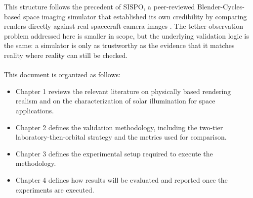 This structure follows the precedent of SISPO, a peer-reviewed Blender-Cycles-based space imaging simulator that established its own credibility by comparing renders directly against real spacecraft camera images \cite{sispo2022}. The tether observation problem addressed here is smaller in scope, but the underlying validation logic is the same: a simulator is only as trustworthy as the evidence that it matches reality where reality can still be checked.
\\\\
This document is organized as follows:

\begin{itemize}
    \item Chapter 1 reviews the relevant literature on physically based rendering realism and on the characterization of solar illumination for space applications.
    \item Chapter 2 defines the validation methodology, including the two-tier laboratory-then-orbital strategy and the metrics used for comparison.
    \item Chapter 3 defines the experimental setup required to execute the methodology.
    \item Chapter 4 defines how results will be evaluated and reported once the experiments are executed.
\end{itemize}

